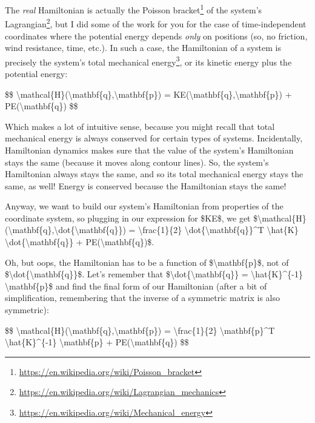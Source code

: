 \documentclass[]{article}
\renewcommand{\href}[2]{#2\footnote{\url{#1}}}
\begin{document}
The \emph{real} Hamiltonian is actually the
\href{https://en.wikipedia.org/wiki/Poisson_bracket}{Poisson bracket} of the
system's \href{https://en.wikipedia.org/wiki/Lagrangian_mechanics}{Lagrangian},
but I did some of the work for you for the case of time-independent coordinates
where the potential energy depends \emph{only} on positions (so, no friction,
wind resistance, time, etc.). In such a case, the Hamiltonian of a system is
precisely the system's total
\href{https://en.wikipedia.org/wiki/Mechanical_energy}{mechanical energy}, or
its kinetic energy plus the potential energy:

\$\$
\textbackslash{}mathcal\{H\}(\textbackslash{}mathbf\{q\},\textbackslash{}mathbf\{p\})
= KE(\textbackslash{}mathbf\{q\},\textbackslash{}mathbf\{p\}) +
PE(\textbackslash{}mathbf\{q\}) \$\$

Which makes a lot of intuitive sense, because you might recall that total
mechanical energy is always conserved for certain types of systems.
Incidentally, Hamiltonian dynamics makes sure that the value of the system's
Hamiltonian stays the same (because it moves along contour lines). So, the
system's Hamiltonian always stays the same, and so its total mechanical energy
stays the same, as well! Energy is conserved because the Hamiltonian stays the
same!

Anyway, we want to build our system's Hamiltonian from properties of the
coordinate system, so plugging in our expression for \$KE\$, we get
\$\textbackslash{}mathcal\{H\}(\textbackslash{}mathbf\{q\},\textbackslash{}dot\{\textbackslash{}mathbf\{q\}\})
= \textbackslash{}frac\{1\}\{2\}
\textbackslash{}dot\{\textbackslash{}mathbf\{q\}\}\^{}T \textbackslash{}hat\{K\}
\textbackslash{}dot\{\textbackslash{}mathbf\{q\}\} +
PE(\textbackslash{}mathbf\{q\})\$.

Oh, but oops, the Hamiltonian has to be a function of
\$\textbackslash{}mathbf\{p\}\$, not of
\$\textbackslash{}dot\{\textbackslash{}mathbf\{q\}\}\$. Let's remember that
\$\textbackslash{}dot\{\textbackslash{}mathbf\{q\}\} =
\textbackslash{}hat\{K\}\^{}\{-1\} \textbackslash{}mathbf\{p\}\$ and find the
final form of our Hamiltonian (after a bit of simplification, remembering that
the inverse of a symmetric matrix is also symmetric):

\$\$
\textbackslash{}mathcal\{H\}(\textbackslash{}mathbf\{q\},\textbackslash{}mathbf\{p\})
= \textbackslash{}frac\{1\}\{2\} \textbackslash{}mathbf\{p\}\^{}T
\textbackslash{}hat\{K\}\^{}\{-1\} \textbackslash{}mathbf\{p\} +
PE(\textbackslash{}mathbf\{q\}) \$\$
\end{document}
